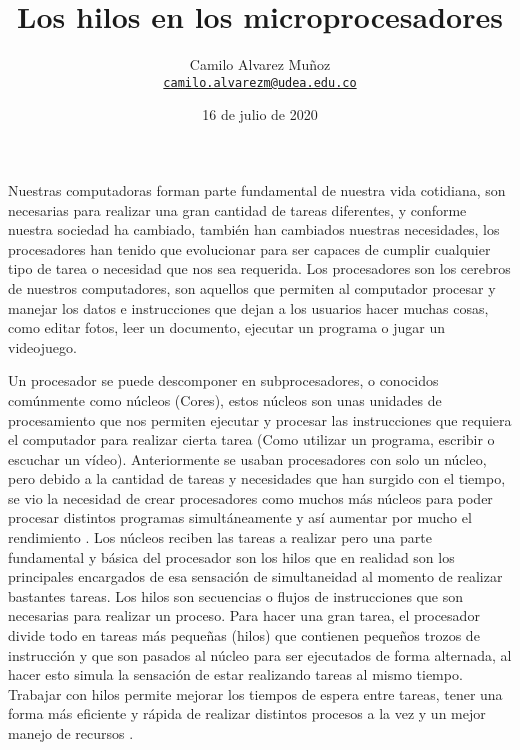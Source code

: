 \documentclass[12pt]{article}
\title{Los hilos en los microprocesadores}
\date{16 de julio de 2020}
\author{Camilo Alvarez Muñoz\\
\href{mailto:camilo.alvarezm@udea.edu.co}{\texttt{camilo.alvarezm@udea.edu.co}}}
\begin{document}
{
\maketitle}
Nuestras computadoras forman parte fundamental de nuestra vida cotidiana, son necesarias para realizar una gran cantidad de tareas diferentes, y conforme nuestra sociedad ha cambiado, también han cambiados nuestras necesidades, los procesadores han tenido que evolucionar para ser capaces de cumplir cualquier tipo de  tarea o necesidad que nos sea requerida. Los procesadores son los cerebros de nuestros computadores, son aquellos que permiten al computador procesar y manejar los datos e instrucciones que dejan a los usuarios hacer muchas cosas, como editar fotos, leer un documento, ejecutar un programa o jugar un videojuego. 

Un procesador se puede descomponer en subprocesadores, o conocidos comúnmente como núcleos (Cores), estos núcleos son unas unidades de procesamiento que nos permiten ejecutar y procesar las instrucciones que requiera el computador para realizar cierta tarea (Como utilizar un programa, escribir o escuchar un vídeo). Anteriormente se usaban procesadores con solo un núcleo, pero debido a la cantidad de tareas y necesidades que han surgido con el tiempo, se vio la necesidad de crear procesadores como muchos más núcleos para poder procesar distintos programas simultáneamente y así aumentar por mucho el rendimiento \cite{Nucleos_e_Hilos}.
Los núcleos reciben las tareas a realizar pero una parte fundamental y básica del procesador son los hilos que en realidad son los principales encargados de esa sensación de simultaneidad al momento de realizar bastantes tareas. 
Los hilos son secuencias o flujos de instrucciones que son necesarias para realizar un proceso. Para hacer una gran tarea, el procesador divide todo  en tareas más pequeñas (hilos) que contienen pequeños trozos de instrucción y  que son pasados al núcleo para ser ejecutados de forma alternada, al hacer esto simula la sensación de estar realizando tareas al mismo tiempo. Trabajar con hilos permite mejorar los tiempos de espera entre tareas, tener una forma más eficiente y rápida de realizar distintos procesos a la vez y un mejor manejo de recursos \cite{Diferencias}.
\end{document}
